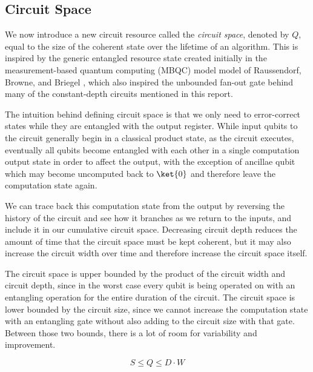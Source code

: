 \subsection{Circuit Space}

We now introduce a new circuit resource called the \emph{circuit space},
denoted by $Q$,
equal to the size of the coherent state over the lifetime of an algorithm.
This is inspired by the generic entangled resource state created initially
in the measurement-based quantum computing (MBQC) model
model of Raussendorf, Browne, and Briegel \cite{Raussendorf2003},
which also inspired the unbounded fan-out gate behind many of the constant-depth
circuits mentioned in this report.

The intuition behind defining circuit space is that we only need to
error-correct states while they are entangled with the output register.
While input qubits to the circuit generally begin in a classical
product state, as the circuit executes, eventually all qubits become entangled
with each other in a single computation output state
in order to affect the output, with the exception of
ancillae qubit which may become uncomputed back to $\ket{0}$ and therefore
leave the computation state again.

We can trace back this computation state from the output by reversing the
history of the circuit and see how it
branches as we return to the inputs, and include it in our cumulative
circuit space.
Decreasing circuit depth reduces the amount of time that the circuit space
must be kept coherent, but it may also increase the circuit
width over time and therefore increase the circuit space itself.

The circuit space is upper bounded by the product of the circuit width and
circuit depth, since in the worst case every qubit is being operated on with
an entangling operation for the entire duration of the circuit.
The circuit space is lower bounded by the circuit size, since we cannot
increase the computation state with an entangling gate without also
adding to the circuit size with that gate. Between those two bounds, there is
a lot of room for variability and improvement.

\begin{equation}
S \le Q \le D\cdot W
\end{equation}


